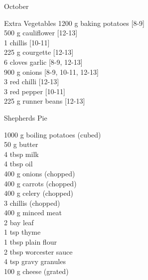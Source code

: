 \begin{menu}{October}
\begin{shoppinglist}{Extra Vegetables}
      1200 g baking potatoes {\scriptsize[8-9]}\\
      500 g cauliflower {\scriptsize[12-13]}\\
      1  chillis {\scriptsize[10-11]}\\
      225 g courgette {\scriptsize[12-13]}\\
      6 cloves garlic {\scriptsize[8-9, 12-13]}\\
      900 g onions {\scriptsize[8-9, 10-11, 12-13]}\\
      3  red chilli {\scriptsize[12-13]}\\
      3  red pepper {\scriptsize[10-11]}\\
      225 g runner beans {\scriptsize[12-13]}\\
      \end{shoppinglist}%
      \par\vfil %
    \vfil\clearpage
  
    \begin{recipe}{2}{Shepherds Pie}%
		\begin{ingredients}
		1000 g boiling potatoes (cubed) \\
	50 g butter  \\
	4 tbsp milk  \\
	4 tbsp oil  \\
	400 g onions (chopped) \\
	400 g carrots (chopped) \\
	400 g celery (chopped) \\
	3  chillis (chopped) \\
	400 g minced meat  \\
	2  bay leaf  \\
	1 tsp thyme  \\
	1 tbsp plain flour  \\
	2 tbsp worcester sauce  \\
	4 tsp gravy granules  \\
	100 g cheese (grated) \\
	
		\end{ingredients}
	
	
	

\end{recipe}
\end{menu}
